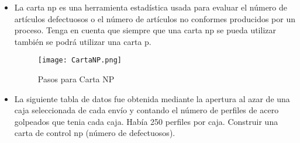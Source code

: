 \documentclass{article}
\theoremstyle{mytheoremstyle}
\theoremstyle{mytheoremstyle}
\theoremstyle{myproblemstyle}
\begin{document}
\begin{itemize}
    \item La carta np es una herramienta estadística usada para evaluar el número de artículos
    defectuosos o el número de artículos no conformes producidos por un proceso. Tenga en cuenta
    que siempre que una carta np se pueda utilizar también se podrá utilizar una carta p.
    \begin{figure}[H]
        \centering
        \texttt{[image: CartaNP.png]}
        \caption[short]{Pasos para Carta NP}
        \label{fig:cartaNP} %
      \end{figure}
    \item La siguiente tabla de datos fue obtenida mediante la apertura al azar de una caja seleccionada
    de cada envío y contando el número de perfiles de acero golpeados que tenia cada caja. Había 250
    perfiles por caja.
    Construir una carta de control np (número de defectuosos).
\end{itemize}

  
\nocite{*}

\end{document}
